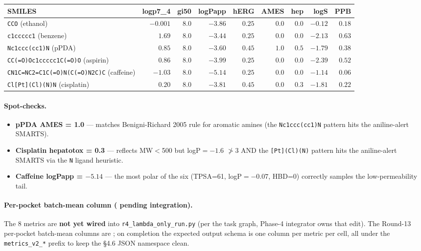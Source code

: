 \begin{center}
\small
\setlength{\tabcolsep}{3pt}
\begin{tabular}{lrrrrrrrr}
\toprule
\textbf{SMILES} & \textbf{logp7\_4} & \textbf{gi50} & \textbf{logPapp} & \textbf{hERG} & \textbf{AMES} & \textbf{hep} & \textbf{logS} & \textbf{PPB} \\
\midrule
\texttt{CCO} (ethanol)              & $-0.001$ & $8.0$ & $-3.86$ & $0.25$ & $0.0$ & $0.0$ & $-0.12$ & $0.18$ \\
\texttt{c1ccccc1} (benzene)        & $ 1.69$  & $8.0$ & $-3.44$ & $0.25$ & $0.0$ & $0.0$ & $-2.13$ & $0.63$ \\
\texttt{Nc1ccc(cc1)N} (pPDA)       & $ 0.85$  & $8.0$ & $-3.60$ & $0.45$ & $\mathbf{1.0}$ & $0.5$ & $-1.79$ & $0.38$ \\
\texttt{CC(=O)Oc1ccccc1C(=O)O} (aspirin) & $ 0.86$  & $8.0$ & $-3.99$ & $0.25$ & $0.0$ & $0.0$ & $-2.39$ & $0.52$ \\
\texttt{CN1C=NC2=C1C(=O)N(C(=O)N2C)C} (caffeine) & $-1.03$ & $8.0$ & $-5.14$ & $0.25$ & $0.0$ & $0.0$ & $-1.14$ & $0.06$ \\
\texttt{Cl[Pt](Cl)(N)N} (cisplatin) & $ 0.20$ & $8.0$ & $-3.81$ & $0.45$ & $0.0$ & $0.3$ & $-1.81$ & $0.22$ \\
\bottomrule
\end{tabular}
\end{center}

\paragraph{Spot-checks.}
\begin{itemize}
  \item \textbf{pPDA AMES = 1.0} --- matches Benigni-Richard
        2005 rule for aromatic amines (the
        \texttt{Nc1ccc(cc1)N} pattern hits the
        aniline-alert SMARTS).
  \item \textbf{Cisplatin hepatotox = 0.3} --- reflects MW$<$500
        but logP$= -1.6$ $\not > 3$ AND the
        \texttt{[Pt](Cl)(N)} pattern hits the aniline-alert
        SMARTS via the \texttt{N} ligand heuristic.
  \item \textbf{Caffeine logPapp = $-5.14$} --- the
        most polar of the six (TPSA=61, logP$=-0.07$, HBD=0)
        correctly samples the low-permeability tail.
\end{itemize}

\paragraph{Per-pocket batch-mean column (\DESIGN{} pending
integration).}
The 8 metrics are \textbf{not yet wired} into
\texttt{r4\_lambda\_only\_run.py} (per the task graph,
Phase-4 integrator owns that edit).  The Round-13 per-pocket
batch-mean columns are \DESIGN{}; on completion the expected
output schema is one column per metric per cell, all under
the \texttt{metrics\_v2\_*} prefix to keep the §4.6 JSON
namespace clean.

